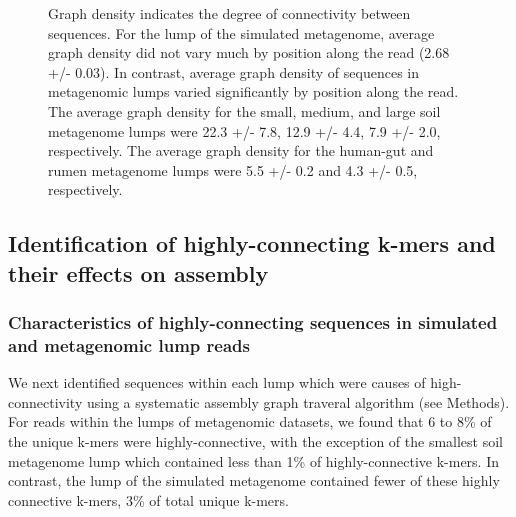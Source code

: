 \documentclass[11pt]{article} %
\begin{document}
\begin{figure}
\caption{Graph density indicates the degree of connectivity between sequences.  For the lump of the simulated metagenome, average graph density did not vary much by position along the read (2.68 +/- 0.03).  In contrast, average graph density of sequences in metagenomic lumps varied significantly by position along the read.  The average graph density for the small, medium, and large soil metagenome lumps were 22.3 +/- 7.8, 12.9 +/- 4.4, 7.9 +/- 2.0, respectively.  The average graph density for the human-gut and rumen metagenome lumps were 5.5 +/- 0.2 and 4.3 +/- 0.5, respectively.}
\end{figure}

\subsection{Identification of highly-connecting k-mers and their effects on assembly}

\subsubsection{Characteristics of highly-connecting sequences in simulated and metagenomic lump reads}

We next identified sequences within each lump which were causes of high-connectivity using a systematic assembly graph traveral algorithm (see Methods).  For reads within the lumps of metagenomic datasets, we found that 6 to 8\% of the unique k-mers were highly-connective, with the exception of the smallest soil metagenome lump which contained less than 1\% of highly-connective k-mers.  In contrast, the lump of the simulated metagenome contained fewer of these highly connective k-mers, 3\% of total unique k-mers.  
\end{document}
